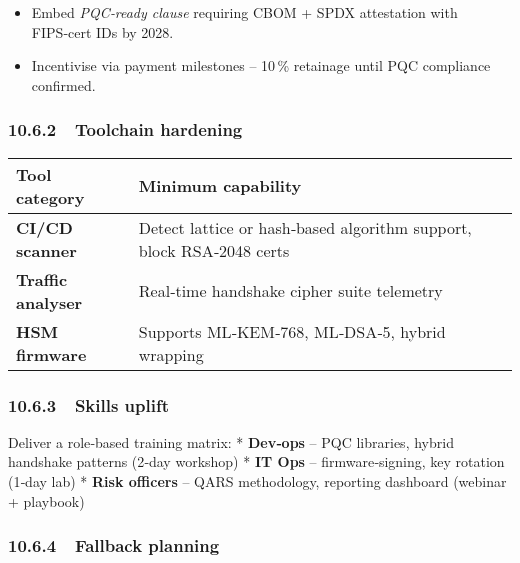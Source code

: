 \documentclass[
  english,
]{article}
\providecommand{\tightlist}{%
  \setlength{\itemsep}{0pt}\setlength{\parskip}{0pt}}
\begin{document}
\begin{itemize}
\tightlist
\item
  Embed \emph{PQC‑ready clause} requiring CBOM + SPDX attestation with
  FIPS‑cert IDs by 2028.
\item
  Incentivise via payment milestones -- 10\,\% retainage until PQC
  compliance confirmed.
\end{itemize}

\subsubsection{10.6.2~~Toolchain hardening}\label{toolchain-hardening}

\begin{longtable}[]{@{}
  >{\raggedright\arraybackslash}p{}
  >{\raggedright\arraybackslash}p{}@{}}
\toprule\noalign{}
\begin{minipage}[b]{\linewidth}\raggedright
Tool category
\end{minipage} & \begin{minipage}[b]{\linewidth}\raggedright
Minimum capability
\end{minipage} \\
\midrule\noalign{}
\endhead
\bottomrule\noalign{}
\endlastfoot
\textbf{CI/CD scanner} & Detect lattice or hash‑based algorithm support,
block RSA‑2048 certs \\
\textbf{Traffic analyser} & Real‑time handshake cipher suite
telemetry \\
\textbf{HSM firmware} & Supports ML‑KEM‑768, ML‑DSA‑5, hybrid
wrapping \\
\end{longtable}

\subsubsection{10.6.3~~Skills uplift}\label{skills-uplift}

Deliver a role‑based training matrix: * \textbf{Dev‑ops} -- PQC
libraries, hybrid handshake patterns (2‑day workshop) * \textbf{IT Ops}
-- firmware‑signing, key rotation (1‑day lab) * \textbf{Risk officers}
-- QARS methodology, reporting dashboard (webinar + playbook)

\subsubsection{10.6.4~~Fallback planning}\label{fallback-planning}
\end{document}
